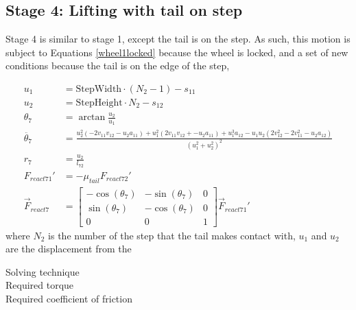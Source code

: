 \subsection*{Stage 4: Lifting with tail on step}
Stage 4 is similar to stage 1, except the tail is on the step. As such, this motion is subject to Equations \ref{wheel1locked} because the wheel is locked, and a set of new conditions because the tail is on the edge of the step,

\begin{subequations}
	\label{tailonstep}
	\begin{align}
		u_1 &= \mathrm{StepWidth}\cdot (N_2-1)- s_{11}\\
		u_2 &= \mathrm{StepHeight}\cdot N_2 - s_{12}\\
		\theta_7 &= \arctan{\frac{u_2}{u_1}}\\
		\ddot{\theta_7} &= \frac{u_2^2 (-2  v_{11}  v_{12} - u_2  a_{11}) + u_1^2 (2  v_{11}  v_{12} + -u_2 a_{11}) + u_1^3  a_{12} - u_1  u_2  (2 v_{12}^2 - 2  v_{11}^2 - u_2  a_{12})}{(u_1^2 + u_2^2)^2}\\
		r_7 &= \frac{u_2}{l_{72}}\\
		F_{react71}' &= -\mu_{tail} F_{react72}'\\
		\vec{F}_{react7} &= \begin{bmatrix}
			-\cos{(\theta_7)} & -\sin{(\theta_7)} & 0\\
			\sin{(\theta_7)} & -\cos{(\theta_7)} & 0\\
			0 & 0 & 1
		\end{bmatrix} \vec{F}_{react71}'
	\end{align}
\end{subequations}
where $N_2$ is the number of the step that the tail makes contact with, $u_1$ and $u_2$ are the displacement from the 




Solving technique\\
Required torque\\
Required coefficient of friction\\




